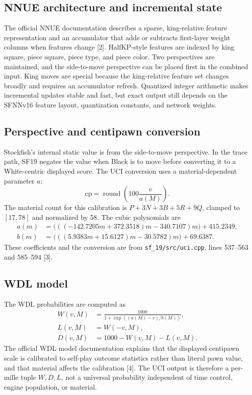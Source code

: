 \documentclass[10pt,conference]{IEEEtran}
\begin{document}
\subsection{NNUE architecture and incremental state}
The official NNUE documentation describes a sparse, king-relative feature representation and an accumulator that adds or subtracts first-layer weight columns when features change [2]. HalfKP-style features are indexed by king square, piece square, piece type, and piece color. Two perspectives are maintained, and the side-to-move perspective can be placed first in the combined input. King moves are special because the king-relative feature set changes broadly and requires an accumulator refresh. Quantized integer arithmetic makes incremental updates stable and fast, but exact output still depends on the SFNNv16 feature layout, quantization constants, and network weights.

\subsection{Perspective and centipawn conversion}
Stockfish's internal static value is from the side-to-move perspective. In the trace path, SF19 negates the value when Black is to move before converting it to a White-centric displayed score. The UCI conversion uses a material-dependent parameter $a$:
\begin{equation}
 \mathrm{cp}=\operatorname{round}\left(100\frac{v}{a(M)}\right).
\end{equation}
The material count for this calibration is $P+3N+3B+5R+9Q$, clamped to $[17,78]$ and normalized by 58. The cubic polynomials are
\begin{align}
 a(m)&=\bigl(((-142.7205m+372.3518)m-340.7107)m\bigr)
       +415.2349,\\
 b(m)&=\bigl(((5.9383m+15.6127)m-30.5782)m\bigr)
       +69.6387.
\end{align}
These coefficients and the conversion are from \texttt{sf\_19/src/uci.cpp}, lines 537--563 and 585--594 [3].

\subsection{WDL model}
The WDL probabilities are computed as
\begin{align}
 W(v,M)&=\frac{1000}{1+\exp((a(M)-v)/b(M))},\\
 L(v,M)&=W(-v,M),\\
 D(v,M)&=1000-W(v,M)-L(v,M).
\end{align}
The official WDL model documentation explains that the displayed centipawn scale is calibrated to self-play outcome statistics rather than literal pawn value, and that material affects the calibration [4]. The UCI output is therefore a per-mille tuple $W,D,L$, not a universal probability independent of time control, engine population, or material.
\end{document}
